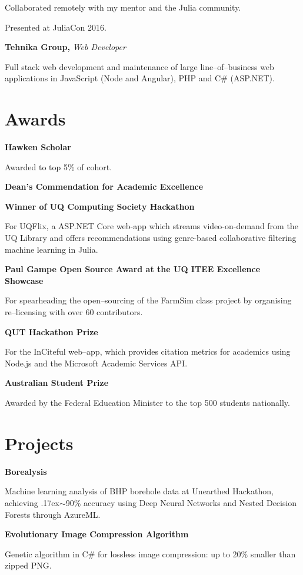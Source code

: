 \documentclass[a4paper]{article}
\renewenvironment{itemize}{
  \begin{list}{}{
    \setlength{\leftmargin}{1.5em}
  }
}{
  \end{list}
}
\newcommand{\dateitem}[1] {\item[\textbf{#1 :}]}
\renewcommand{\tilde} {{\raise.17ex\hbox{$\scriptstyle\mathtt{\sim}$}}}
\newcommand{\accentcolour}{\color{NavyBlue}}
\newcommand{\resumesection}[1]{\section*{\accentcolour #1}}
\newcommand{\resumeitem}[4]{
	\dateitem{#1} {\textbf{#2,} \textit{#3}
		
		#4
	}	
}
\begin{document}
\begin{paracol}{2}
\begin{itemize}
{		Collaborated remotely with my mentor and the Julia community.
		
		Presented at JuliaCon 2016.
	}
	
	\resumeitem{2014 -- 2016}{Tehnika Group}{Web Developer}{		
		Full stack web development and maintenance of large line--of--business web applications in JavaScript (Node and Angular), PHP and C\# (ASP.NET).
	}
\end{itemize}

\resumesection{Awards}
\begin{itemize}
	\dateitem{2017 -- 2018} {\textbf{Hawken Scholar}
		
		Awarded to top 5\% of cohort.
	}
	\dateitem{2016 -- 2017} \textbf{Dean's Commendation for Academic Excellence}
	\dateitem{2016} {\textbf{Winner of UQ Computing Society Hackathon}
		
		For UQFlix, a ASP.NET Core web-app which streams video-on-demand from the UQ Library and offers recommendations using genre-based collaborative filtering machine learning in Julia.
	}
	\dateitem{2015} {\textbf{Paul Gampe Open Source Award at the UQ ITEE Excellence Showcase}
		
		For spearheading the open--sourcing of the FarmSim class project by organising re--licensing with over 60 contributors.
	}

	\dateitem{2015} {\textbf{QUT Hackathon Prize}
		
		For the InCiteful web--app, which provides citation metrics for academics using Node.js and the Microsoft Academic Services API.
	}
	\dateitem{2013} {\textbf{Australian Student Prize}
		
		Awarded by the Federal Education Minister to the top 500 students nationally.
	}
\end{itemize}

\resumesection{Projects}
\begin{itemize}	
	\dateitem{2016} {\textbf{Borealysis}
		
		Machine learning analysis of BHP borehole data at Unearthed Hackathon, achieving \tilde{}90\% accuracy using Deep Neural Networks and Nested Decision Forests through AzureML.
	}
	
	\dateitem{2013} {\textbf{Evolutionary Image Compression Algorithm}
		
		Genetic algorithm in C\# for lossless image compression: up to 20\% smaller than zipped PNG.
	}
\end{itemize}

\switchcolumn


\end{paracol}
\end{document}
